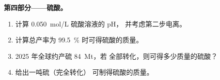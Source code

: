 \begin{problem}
\medskip
\noindent\textbf{第四部分——硫酸。}
\begin{enumerate}[resume]
  \item 计算 \qty{0.050}{mol/L} 硫酸溶液的 pH，
        并考虑第二步电离。
  \item 计算总产率为
        \qty{99.5}{\percent} 时可得硫酸的质量。
  \item 2025 年全球约产硫 \qty{84}{Mt}，若
        全部转化，则可得多少质量的硫酸？
  \item 给出一吨硫（完全转化）
        可制得硫酸的质量。
\end{enumerate}
\end{problem}
